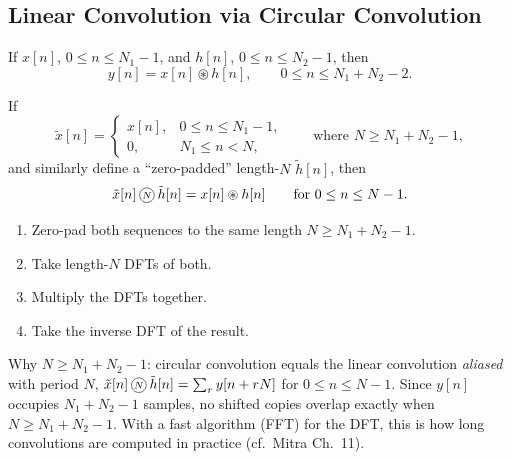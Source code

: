 \documentclass[handout_subfiles_root.tex]{subfiles}
\begin{document}
\subsection{Linear Convolution via Circular Convolution}

If $x[n]$, $0\le n\le N_1-1$, and $h[n]$, $0\le n\le N_2-1$, then
\begin{equation*}
y[n] = x[n]\circledast h[n], \qquad 0\le n\le N_1+N_2-2.
\end{equation*}

\begin{factbox}[title={Property}]
If
\begin{equation*}
\tilde x[n] = \begin{cases} x[n], & 0\le n\le N_1-1, \\ 0, & N_1\le n< N, \end{cases}
\qquad \text{where } N\ge N_1+N_2-1,
\end{equation*}
and similarly define a ``zero-padded'' length-$N$ $\tilde h[n]$, then
\begin{equation*}
\tilde x[n] \HandoutCircConv \tilde h[n] = x[n]\circledast h[n] \qquad \text{for } 0\le n\le N-1.
\end{equation*}
\end{factbox}

\begin{factbox}[title={Consequence: we can compute $\circledast$ using $\HandoutCircConv$!}, handout mark=10]
\begin{enumerate}
  \item Zero-pad both sequences to the same length $N\ge N_1+N_2-1$.
  \item Take length-$N$ DFTs of both.
  \item Multiply the DFTs together.
  \item Take the inverse DFT of the result.
\end{enumerate}
\end{factbox}

\begin{notebox}[title=\HandoutNoteAddendumTitle]
Why $N\ge N_1+N_2-1$: circular convolution equals the linear convolution \emph{aliased} with period $N$,
$\tilde x[n]\HandoutCircConv\tilde h[n] = \sum_{r} y[n+rN]$ for $0\le n\le N-1$. Since $y[n]$ occupies $N_1+N_2-1$ samples, no shifted copies overlap exactly when $N\ge N_1+N_2-1$.
With a fast algorithm (FFT) for the DFT, this is how long convolutions are computed in practice (cf.\ Mitra Ch.~11).
\end{notebox}
\end{document}
